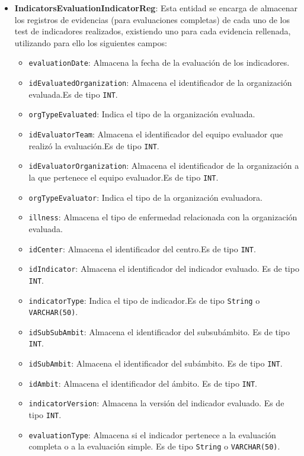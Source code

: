 \begin{itemize}
    \item \textbf{IndicatorsEvaluationIndicatorReg}: Esta entidad se encarga de almacenar los registros de evidencias (para evaluaciones completas) de cada uno de los test de indicadores realizados, existiendo uno para cada evidencia rellenada, utilizando para ello los siguientes campos:
    \begin{itemize}
      \item \texttt{evaluationDate}: Almacena la fecha de la evaluación de los indicadores.
      \item \texttt{idEvaluatedOrganization}: Almacena el identificador de la organización evaluada.Es de tipo \texttt{INT}.
      \item \texttt{orgTypeEvaluated}: Indica el tipo de la organización evaluada.
      \item \texttt{idEvaluatorTeam}: Almacena el identificador del equipo evaluador que realizó la evaluación.Es de tipo \texttt{INT}.
      \item \texttt{idEvaluatorOrganization}: Almacena el identificador de la organización a la que pertenece el equipo evaluador.Es de tipo \texttt{INT}.
      \item \texttt{orgTypeEvaluator}: Indica el tipo de la organización evaluadora.
      \item \texttt{illness}: Almacena el tipo de enfermedad relacionada con la organización evaluada.
      \item \texttt{idCenter}: Almacena el identificador del centro.Es de tipo \texttt{INT}.
      \item \texttt{idIndicator}: Almacena el identificador del indicador evaluado. Es de tipo \texttt{INT}.
      \item \texttt{indicatorType}: Indica el tipo de indicador.Es de tipo \texttt{String} o \texttt{VARCHAR(50)}.
      \item \texttt{idSubSubAmbit}: Almacena el identificador del subsubámbito. Es de tipo \texttt{INT}.
      \item \texttt{idSubAmbit}: Almacena el identificador del subámbito. Es de tipo \texttt{INT}.
      \item \texttt{idAmbit}: Almacena el identificador del ámbito. Es de tipo \texttt{INT}.
      \item \texttt{indicatorVersion}: Almacena la versión del indicador evaluado. Es de tipo \texttt{INT}.
      \item \texttt{evaluationType}: Almacena si el indicador pertenece a la evaluación completa o a la evaluación simple. Es de tipo \texttt{String} o \texttt{VARCHAR(50)}.

\end{itemize}
\end{itemize}
